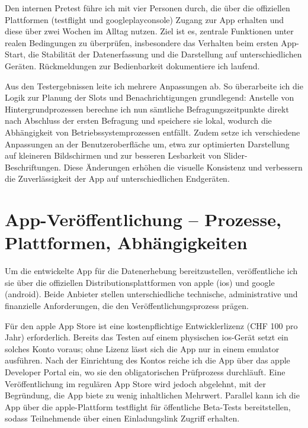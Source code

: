 Den internen Pretest führe ich mit vier Personen durch, die über die offiziellen Plattformen (\gls{testflight} und \gls{googleplayconsole}) Zugang zur App erhalten und diese über zwei Wochen im Alltag nutzen. Ziel ist es, zentrale Funktionen unter realen Bedingungen zu überprüfen, insbesondere das Verhalten beim ersten App-Start, die Stabilität der Datenerfassung und die Darstellung auf unterschiedlichen Geräten. Rückmeldungen zur Bedienbarkeit dokumentiere ich laufend.

Aus den Testergebnissen leite ich mehrere Anpassungen ab. So überarbeite ich die Logik zur Planung der Slots und Benachrichtigungen grundlegend: Anstelle von Hintergrundprozessen berechne ich nun sämtliche Befragungszeitpunkte direkt nach Abschluss der ersten Befragung und speichere sie lokal, wodurch die Abhängigkeit von Betriebssystemprozessen entfällt. Zudem setze ich verschiedene Anpassungen an der Benutzeroberfläche um, etwa zur optimierten Darstellung auf kleineren Bildschirmen und zur besseren Lesbarkeit von Slider-Beschriftungen. Diese Änderungen erhöhen die visuelle Konsistenz und verbessern die Zuverlässigkeit der App auf unterschiedlichen Endgeräten.

\section{App-Veröffentlichung -- Prozesse, Plattformen, Abhängigkeiten}

Um die entwickelte App für die Datenerhebung bereitzustellen, veröffentliche ich sie über die offiziellen Distributionsplattformen von \gls{apple} (\gls{ios}) und \gls{google} (\gls{android}). Beide Anbieter stellen unterschiedliche technische, administrative und finanzielle Anforderungen, die den Veröffentlichungsprozess prägen.

Für den \gls{apple} App Store ist eine kostenpflichtige Entwicklerlizenz (CHF 100 pro Jahr) erforderlich. Bereits das Testen auf einem physischen \gls{ios}-Gerät setzt ein solches Konto voraus; ohne Lizenz lässt sich die App nur in einem \gls{emulator} ausführen. Nach der Einrichtung des Kontos reiche ich die App über das \gls{apple} Developer Portal ein, wo sie den obligatorischen Prüfprozess durchläuft. Eine Veröffentlichung im regulären App Store wird jedoch abgelehnt, mit der Begründung, die App biete zu wenig inhaltlichen Mehrwert. Parallel kann ich die App über die \gls{apple}-Plattform \gls{testflight} für öffentliche Beta-Tests bereitstellen, sodass Teilnehmende über einen Einladungslink Zugriff erhalten.

